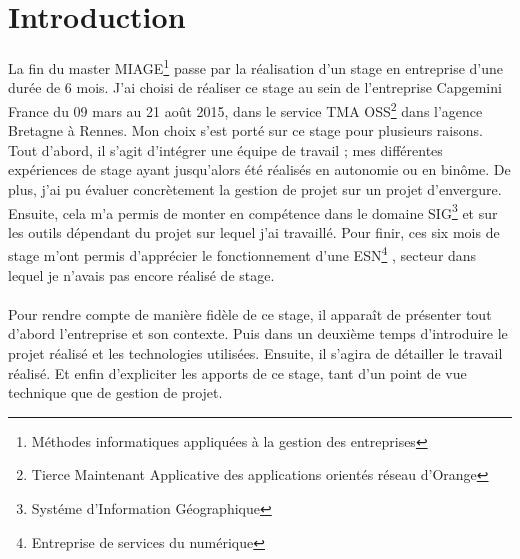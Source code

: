 \chapter*{Introduction}

La fin du master MIAGE\footnote{Méthodes informatiques appliquées à la gestion des entreprises}
passe par la réalisation d’un stage en entreprise d’une durée de 6 mois.
J’ai choisi de réaliser ce stage au sein de l’entreprise Capgemini France du 09 mars au 21 août 2015,
dans le service TMA OSS\footnote{Tierce Maintenant Applicative des applications orientés réseau d'Orange} dans l’agence Bretagne à Rennes.
Mon choix s’est porté sur ce stage pour plusieurs raisons. Tout d’abord, il s’agit d’intégrer
une équipe de travail ; mes différentes expériences de stage ayant jusqu’alors été réalisés en
autonomie ou en binôme. De plus, j’ai pu évaluer concrètement la gestion de projet sur un
projet d’envergure. Ensuite, cela m’a permis de monter en compétence dans le domaine SIG\footnote{Systéme d'Information Géographique} et sur les outils dépendant du projet sur lequel j'ai travaillé.
 Pour finir, ces six mois de stage m’ont permis d’apprécier le
fonctionnement d’une ESN\footnote{Entreprise de services du numérique}
, secteur dans lequel je n’avais pas encore réalisé de stage.
\\\\

Pour rendre compte de manière fidèle de ce stage, il apparaît de présenter tout d’abord
l’entreprise et son contexte. Puis dans un deuxième temps d’introduire le projet réalisé et les
technologies utilisées. Ensuite, il s’agira de détailler le travail réalisé. Et enfin d’expliciter les
apports de ce stage, tant d’un point de vue technique que de gestion de projet.
